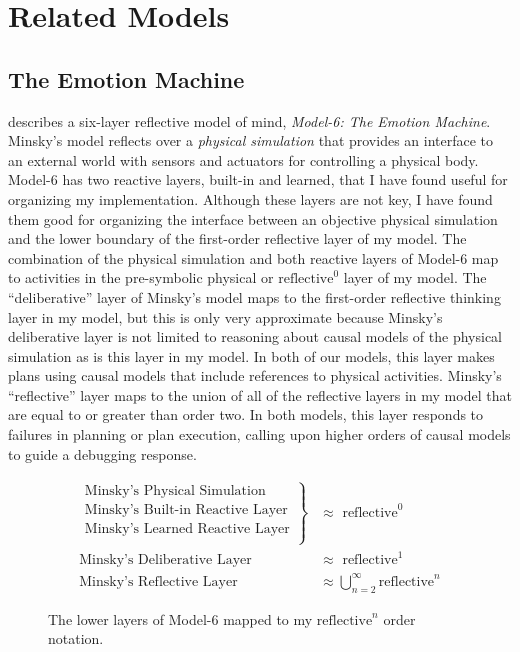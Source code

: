 \chapter{Related Models}
\label{chapter:related_models}

\section{The Emotion Machine}
\label{backreference:self_reflective_self_conscious}

\cite{minsky:2006} describes a six-layer reflective model of mind,
\emph{\mbox{Model-6}: The Emotion Machine}.  Minsky's model reflects
over a \emph{physical simulation} that provides an interface to an
external world with sensors and actuators for controlling a physical
body.  \mbox{Model-6} has two reactive layers, built-in and learned,
that I have found useful for organizing my implementation.  Although
these layers are not key, I have found them good for organizing the
interface between an objective physical simulation and the lower
boundary of the first-order reflective layer of my model.  The
combination of the physical simulation and both reactive layers of
\mbox{Model-6} map to activities in the pre-symbolic physical or
$\text{reflective}^0$ layer of my model.  The ``deliberative'' layer
of Minsky's model maps to the first-order reflective thinking layer in
my model, but this is only very approximate because Minsky's
deliberative layer is not limited to reasoning about causal models of
the physical simulation as is this layer in my model.  In both of our
models, this layer makes plans using causal models that include
references to physical activities.  Minsky's ``reflective'' layer maps
to the union of all of the reflective layers in my model that are
equal to or greater than order two.  In both models, this layer
responds to failures in planning or plan execution, calling upon
higher orders of causal models to guide a debugging response.

\begin{figure}[bth]
\begin{align*}
\left.
  \begin{array}{l}
    \text{Minsky's Physical Simulation}\\
    \text{Minsky's Built-in Reactive Layer}\\
    \text{Minsky's Learned Reactive Layer}\\
  \end{array}
\right\}                            &{\approx} \text{ reflective}^0 \\
\text{Minsky's Deliberative Layer } &{\approx} \text{ reflective}^1 \\
\text{Minsky's Reflective Layer }   &{\approx} \bigcup_{n=2}^{\infty}{\text{reflective}^n}
\end{align*}
\caption{The lower layers of Model-6 mapped to my
  $\text{reflective}^n$ order notation.}
\label{figure:model_6_as_reflective_order_notation}
\end{figure}

